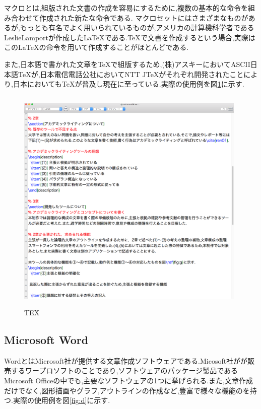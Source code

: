 \documentclass[a4j,12pt]{jarticle}
\begin{document}
マクロとは,組版された文書の作成を容易にするために,複数の基本的な命令を組み合わせて作成された新たな命令である.
マクロセットにはさまざまなものがあるが,もっとも有名でよく用いられているものが,アメリカの計算機科学者であるLeslieLamportが作成したLaTeXである.TeXで文書を作成するという場合,実際はこのLaTeXの命令を用いて作成することがほとんどである.

また,日本語で書かれた文章をTeXで組版するため,(株)アスキーにおいてASCII日本語TeXが,日本電信電話公社においてNTT JTeXがそれぞれ開発されたことにより,日本においてもTeXが普及し現在に至っている\cite{ren3}.実際の使用例を図\ref{fig:c}に示す.

\begin{figure}[H]
\begin{center}
 \includegraphics[clip,width=110mm,height=110mm]{TEX.png}
 \end{center}
 \caption{TEX}
 \label{fig:c}
\end{figure}

\subsection{Microsoft Word}
WordとはMicrosoft社が提供する文章作成ソフトウェアである.Micosoft社がが販売するワープロソフトのことであり,ソフトウェアのパッケージ製品であるMicrosoft Officeの中でも,主要なソフトウェアの1つに挙げられる.また,文章作成だけでなく,図形描画やグラフ,アウトラインの作成など,豊富で様々な機能のを持つ.実際の使用例を図\ref{fig:d}に示す.
\end{document}
